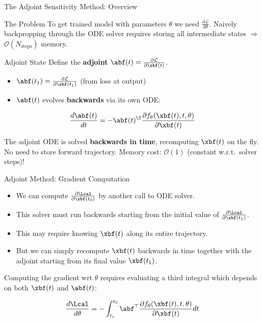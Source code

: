 \documentclass[aspectratio=169,xcolor=dvipsnames,svgnames,x11names,fleqn]{beamer}
\begin{document}
\begin{frame}{The Adjoint Sensitivity Method: Overview}
\scriptsize

\begin{tblockFrost}{The Problem}
To get trained model with parameters $\theta$ we need $\frac{d\mathcal{L}}{d\theta}$. Naively backpropping through the ODE solver requires storing all intermediate states $\Rightarrow$ $\mathcal{O}(N_{\text{steps}})$ memory.
\end{tblockFrost}
\vspace{4pt}
\begin{block}{Adjoint State}
Define the \textbf{adjoint} $\abf(t) = \frac{\partial \mathcal{L}}{\partial \xbf(t)}$.
\begin{itemize}
  \item $\abf(t_1) = \frac{\partial \mathcal{L}}{\partial \xbf(t_1)}$ (from loss at output)
  \item $\abf(t)$ evolves \textbf{backwards} via its own ODE:
\end{itemize}
$$
  \frac{d\abf(t)}{dt} = -\abf(t)^\T \frac{\partial f_\theta(\xbf(t), t, \theta)}{\partial \xbf(t)}
$$
\end{block}
\vspace{4pt}
\begin{alertblock}{}
The adjoint ODE is solved \textbf{backwards in time}, recomputing $\xbf(t)$ on the fly. No need to store forward trajectory. Memory cost: $\mathcal{O}(1)$ (constant w.r.t.\ solver steps)!
\end{alertblock}
\end{frame}



\begin{frame}{Adjoint Method: Gradient Computation}
\scriptsize


\begin{itemize}
\item We can compute $\pdv{\Lcal}{\xbf(t_0)}$ by another call to ODE solver.

\item This solver must run backwards starting from the initial value of $\pdv{\Lcal}{\xbf(t_1)}$.

\item This may require knowing $\xbf(t)$  along its entire trajectory.

\item But we can simply recompute $\xbf(t)$ backwards in time together with the adjoint starting from its final value $\xbf(t_1)$.
\end{itemize}

Computing the gradient wrt $\theta$ requires evaluating a third integral which depends on both $\zbf(t)$ and $\abf(t)$:

\begin{align*}
\frac{d\Lcal}{d\theta} = -\int_{t_1}^{t_0} \abf^\top \frac{\partial f_\theta(\xbf(t), t, \theta)}{\partial \xbf(t)} dt
\end{align*}

\end{frame}
\end{document}
